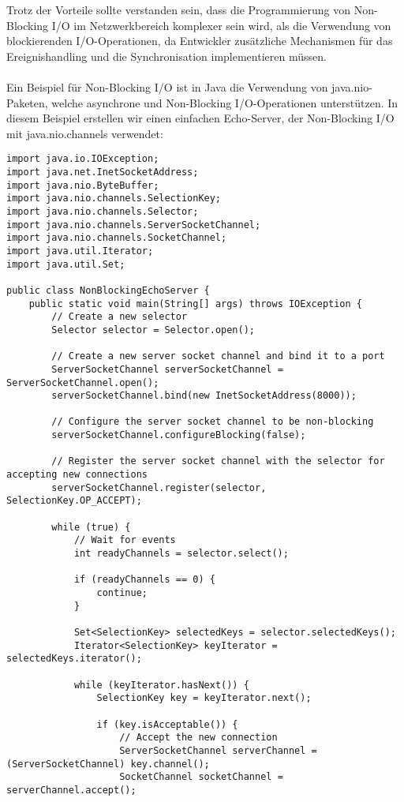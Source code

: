 Trotz der Vorteile sollte verstanden sein, dass die Programmierung von Non-Blocking I/O im Netzwerkbereich komplexer sein wird, als die Verwendung von blockierenden I/O-Operationen, da Entwickler zusätzliche Mechanismen für das Ereignishandling und die Synchronisation implementieren müssen.
\\\\
Ein Beispiel für Non-Blocking I/O ist in Java die Verwendung von java.nio-Paketen, welche asynchrone und Non-Blocking I/O-Operationen unterstützen. In diesem Beispiel erstellen wir einen einfachen Echo-Server, der Non-Blocking I/O mit java.nio.channels verwendet:

\begin{lstlisting}[caption={Non-Blocking},captionpos=b,label={lst:nonb}]
import java.io.IOException;
import java.net.InetSocketAddress;
import java.nio.ByteBuffer;
import java.nio.channels.SelectionKey;
import java.nio.channels.Selector;
import java.nio.channels.ServerSocketChannel;
import java.nio.channels.SocketChannel;
import java.util.Iterator;
import java.util.Set;

public class NonBlockingEchoServer {
    public static void main(String[] args) throws IOException {
        // Create a new selector
        Selector selector = Selector.open();

        // Create a new server socket channel and bind it to a port
        ServerSocketChannel serverSocketChannel = ServerSocketChannel.open();
        serverSocketChannel.bind(new InetSocketAddress(8000));

        // Configure the server socket channel to be non-blocking
        serverSocketChannel.configureBlocking(false);

        // Register the server socket channel with the selector for accepting new connections
        serverSocketChannel.register(selector, SelectionKey.OP_ACCEPT);

        while (true) {
            // Wait for events
            int readyChannels = selector.select();

            if (readyChannels == 0) {
                continue;
            }

            Set<SelectionKey> selectedKeys = selector.selectedKeys();
            Iterator<SelectionKey> keyIterator = selectedKeys.iterator();

            while (keyIterator.hasNext()) {
                SelectionKey key = keyIterator.next();

                if (key.isAcceptable()) {
                    // Accept the new connection
                    ServerSocketChannel serverChannel = (ServerSocketChannel) key.channel();
                    SocketChannel socketChannel = serverChannel.accept();


\end{lstlisting}
